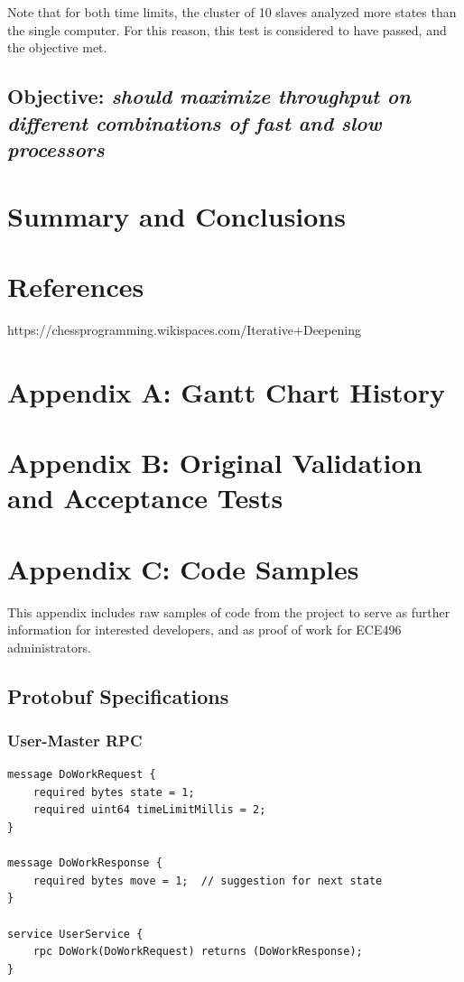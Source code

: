 \documentclass[pdftex,12pt,a4paper]{article}
\begin{document}
Note that for both time limits, the cluster of 10 slaves analyzed more states than the single computer. For this reason, this test is considered to have passed, and the objective met. 


\subsection{\textbf{Objective:} \emph{should maximize throughput on different combinations of fast and slow processors}}

%
%
%
\section{Summary and Conclusions}

%
%
%
\pagebreak
\section{References}

https://chessprogramming.wikispaces.com/Iterative+Deepening

%
%
%
\pagebreak
\section{Appendix A: Gantt Chart History}

%
%
%
\pagebreak
\section{Appendix B: Original Validation and Acceptance Tests}

%
%
\pagebreak
\section{Appendix C: Code Samples}

This appendix includes raw samples of code from the project to serve as further information for interested developers, and as proof of work for ECE496 administrators.

\subsection{Protobuf Specifications}\label{sec:protobuf-sample}

\subsubsection*{User-Master RPC}
\begin{lstlisting}
message DoWorkRequest {
    required bytes state = 1;
    required uint64 timeLimitMillis = 2;
}

message DoWorkResponse {
    required bytes move = 1;  // suggestion for next state
}

service UserService {
    rpc DoWork(DoWorkRequest) returns (DoWorkResponse);
}
\end{lstlisting}
\end{document}
